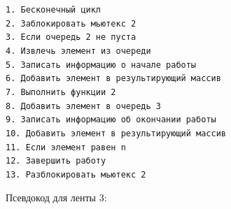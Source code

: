 \documentclass[a4paper,12pt]{article}
\begin{document}
\begin{flushleft}
\texttt{1. Бесконечный цикл\\
2. \hspace{1.5cm} Заблокировать мьютекс 2\\
3. \hspace{1.5cm} Если очередь 2 не пуста\\
4. \hspace{3cm} Извлечь элемент из очереди\\
5. \hspace{3cm} Записать информацию о начале работы\\
6. \hspace{3cm} Добавить элемент в результирующий массив\\
7. \hspace{3cm} Выполнить функции 2\\
8. \hspace{3cm} Добавить элемент в очередь 3\\
9. \hspace{3cm} Записать информацию об окончании работы\\
10. \hspace{3cm} Добавить элемент в результирующий массив\\
11. \hspace{3cm} Если элемент равен n\\
12. \hspace{4.5cm} Завершить работу\\
13. \hspace{1.5cm} Разблокировать мьютекс 2\\
}
\end{flushleft}

Псевдокод для ленты 3:
\end{document}
